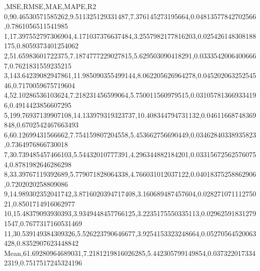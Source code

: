 ,MSE,RMSE,MAE,MAPE,R2
0,90.46530571585262,9.511325129331487,7.376145273195664,0.04813577842702566,0.7861056511541985
1,17.397552797306904,4.171037376637484,3.2557982177816203,0.025426148308188175,0.8059373401254062
2,51.65983601722375,7.1874777229027815,5.629503090418291,0.03335420064006667,0.7621831559235215
3,143.64239082947861,11.985090355499144,8.062205626964278,0.04520206325254546,0.7170059675719604
4,52.10286536103624,7.218231456599064,5.750011560979515,0.031057813669334196,0.4914423856607295
5,199.76937139907108,14.133979319323737,10.408344794731132,0.04611668748369848,0.6702542467663493
6,60.12699431566662,7.754159807204558,5.453662756690449,0.03462840338935823,0.7364976866730018
7,30.739485457466103,5.54432010777391,4.296344882184201,0.033156725625760754,0.8781982646286298
8,33.39767119392689,5.779071828064338,4.766031012037122,0.04018375258862906,0.7202020258809086
9,14.989302352041742,3.8716020394717408,3.160689487457604,0.02827107111275021,0.8501714916062977
10,15.48379093930393,3.9349448457766125,3.2235175550335113,0.029625918312791547,0.7677317160531469
11,30.539149384309326,5.526223790646677,3.9254153323248664,0.05270564520063428,0.8352907623448842
Mean,61.69280964689031,7.2181219816026285,5.442305799149854,0.0373220173342319,0.7517517245324196
